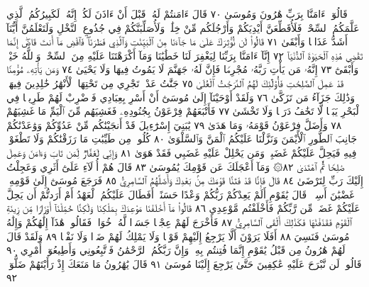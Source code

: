 قَالُوٓا۟ ءَامَنَّا بِرَبِّ هَٰرُونَ وَمُوسَىٰ ٧٠ قَالَ ءَامَنتُمْ لَهُۥ قَبْلَ أَنْ ءَاذَنَ
لَكُمْۖ إِنَّهُۥ لَكَبِيرُكُمُ ٱلَّذِي عَلَّمَكُمُ ٱلسِّحْرَۖ فَلَأُقَطِّعَنَّ أَيْدِيَكُمْ
وَأَرْجُلَكُم مِّنْ خِلَٰفࣲ وَلَأُصَلِّبَنَّكُمْ فِي جُذُوعِ ٱلنَّخْلِ وَلَتَعْلَمُنَّ
أَيُّنَآ أَشَدُّ عَذَابࣰا وَأَبْقَىٰ ٧١ قَالُوا۟ لَن نُّؤْثِرَكَ عَلَىٰ مَا جَآءَنَا مِنَ
ٱلْبَيِّنَٰتِ وَٱلَّذِي فَطَرَنَاۖ فَٱقْضِ مَآ أَنتَ قَاضٍۖ إِنَّمَا تَقْضِي هَٰذِهِ
ٱلْحَيَوٰةَ ٱلدُّنْيَآ ٧٢ إِنَّآ ءَامَنَّا بِرَبِّنَا لِيَغْفِرَ لَنَا خَطَٰيَٰنَا وَمَآ أَكْرَهْتَنَا
عَلَيْهِ مِنَ ٱلسِّحْرِۗ وَٱللَّهُ خَيْرࣱ وَأَبْقَىٰٓ ٧٣ إِنَّهُۥ مَن يَأْتِ رَبَّهُۥ مُجْرِمࣰا
فَإِنَّ لَهُۥ جَهَنَّمَ لَا يَمُوتُ فِيهَا وَلَا يَحْيَىٰ ٧٤ وَمَن يَأْتِهِۦ مُؤْمِنࣰا قَدْ
عَمِلَ ٱلصَّٰلِحَٰتِ فَأُو۟لَٰٓئِكَ لَهُمُ ٱلدَّرَجَٰتُ ٱلْعُلَىٰ ٧٥ جَنَّٰتُ عَدْنࣲ
تَجْرِي مِن تَحْتِهَا ٱلْأَنْهَٰرُ خَٰلِدِينَ فِيهَاۚ وَذَٰلِكَ جَزَآءُ مَن تَزَكَّىٰ ٧٦
وَلَقَدْ أَوْحَيْنَآ إِلَىٰ مُوسَىٰٓ أَنْ أَسْرِ بِعِبَادِي فَٱضْرِبْ لَهُمْ طَرِيقࣰا
فِي ٱلْبَحْرِ يَبَسࣰا لَّا تَخَٰفُ دَرَكࣰا وَلَا تَخْشَىٰ ٧٧ فَأَتْبَعَهُمْ فِرْعَوْنُ
بِجُنُودِهِۦ فَغَشِيَهُم مِّنَ ٱلْيَمِّ مَا غَشِيَهُمْ ٧٨ وَأَضَلَّ فِرْعَوْنُ قَوْمَهُۥ
وَمَا هَدَىٰ ٧٩ يَٰبَنِيٓ إِسْرَٰٓءِيلَ قَدْ أَنجَيْنَٰكُم مِّنْ عَدُوِّكُمْ وَوَٰعَدْنَٰكُمْ
جَانِبَ ٱلطُّورِ ٱلْأَيْمَنَ وَنَزَّلْنَا عَلَيْكُمُ ٱلْمَنَّ وَٱلسَّلْوَىٰ ٨٠ كُلُوا۟ مِن
طَيِّبَٰتِ مَا رَزَقْنَٰكُمْ وَلَا تَطْغَوْا۟ فِيهِ فَيَحِلَّ عَلَيْكُمْ غَضَبِيۖ
وَمَن يَحْلِلْ عَلَيْهِ غَضَبِي فَقَدْ هَوَىٰ ٨١ وَإِنِّي لَغَفَّارࣱ لِّمَن تَابَ
وَءَامَنَ وَعَمِلَ صَٰلِحࣰا ثُمَّ ٱهْتَدَىٰ ٨٢۞ وَمَآ أَعْجَلَكَ عَن
قَوْمِكَ يَٰمُوسَىٰ ٨٣ قَالَ هُمْ أُو۟لَآءِ عَلَىٰٓ أَثَرِي وَعَجِلْتُ إِلَيْكَ
رَبِّ لِتَرْضَىٰ ٨٤ قَالَ فَإِنَّا قَدْ فَتَنَّا قَوْمَكَ مِنۢ بَعْدِكَ وَأَضَلَّهُمُ
ٱلسَّامِرِيُّ ٨٥ فَرَجَعَ مُوسَىٰٓ إِلَىٰ قَوْمِهِۦ غَضْبَٰنَ أَسِفࣰاۚ قَالَ
يَٰقَوْمِ أَلَمْ يَعِدْكُمْ رَبُّكُمْ وَعْدًا حَسَنًاۚ أَفَطَالَ عَلَيْكُمُ ٱلْعَهْدُ
أَمْ أَرَدتُّمْ أَن يَحِلَّ عَلَيْكُمْ غَضَبࣱ مِّن رَّبِّكُمْ فَأَخْلَفْتُم
مَّوْعِدِي ٨٦ قَالُوا۟ مَآ أَخْلَفْنَا مَوْعِدَكَ بِمَلْكِنَا وَلَٰكِنَّا حُمِّلْنَآ
أَوْزَارࣰا مِّن زِينَةِ ٱلْقَوْمِ فَقَذَفْنَٰهَا فَكَذَٰلِكَ أَلْقَى ٱلسَّامِرِيُّ ٨٧
فَأَخْرَجَ لَهُمْ عِجْلࣰا جَسَدࣰا لَّهُۥ خُوَارࣱ فَقَالُوا۟ هَٰذَآ إِلَٰهُكُمْ
وَإِلَٰهُ مُوسَىٰ فَنَسِيَ ٨٨ أَفَلَا يَرَوْنَ أَلَّا يَرْجِعُ إِلَيْهِمْ قَوْلࣰا
وَلَا يَمْلِكُ لَهُمْ ضَرࣰّا وَلَا نَفْعࣰا ٨٩ وَلَقَدْ قَالَ لَهُمْ هَٰرُونُ
مِن قَبْلُ يَٰقَوْمِ إِنَّمَا فُتِنتُم بِهِۦۖ وَإِنَّ رَبَّكُمُ ٱلرَّحْمَٰنُ فَٱتَّبِعُونِي
وَأَطِيعُوٓا۟ أَمْرِي ٩٠ قَالُوا۟ لَن نَّبْرَحَ عَلَيْهِ عَٰكِفِينَ حَتَّىٰ يَرْجِعَ
إِلَيْنَا مُوسَىٰ ٩١ قَالَ يَٰهَٰرُونُ مَا مَنَعَكَ إِذْ رَأَيْتَهُمْ ضَلُّوٓا۟ ٩٢
